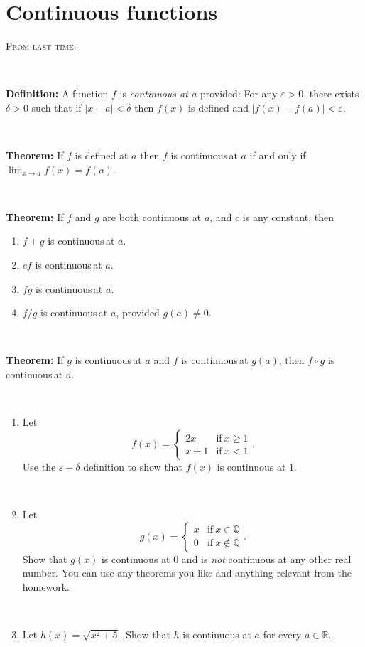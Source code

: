 \documentclass[12pt]{amsart}
\newcommand{\Q}{\mathbb{Q}}
\newcommand{\R}{\mathbb{R}}
\newcommand{\e}{\varepsilon}
\def\d{\delta}
\newcommand{\cts}{continuous\,}
\newcommand{\ds}{\displaystyle}
\begin{document}
	
	\thispagestyle{empty}
	
	\section*{Continuous functions}
	
	\begin{framed}
\noindent \textsc{From last time:}

\

\noindent \textbf{Definition:}  A function $f$ is \emph{continuous at $a$} provided: For any $\e>0$, there exists $\d>0$ such that if $|x-a|<\d$ then $f(x)$ is defined and $|f(x)-f(a)|<\e$.

\

\noindent \textbf{Theorem:} If $f$ is defined at $a$ then $f$ is \cts at $a$ if and only if $\ds\lim_{x\to a} f(x) = f(a)$.

\

\noindent \textbf{Theorem:} If $f$ and $g$ are both continuous at $a$, and $c$ is any constant, then
\begin{enumerate}
\item $f+g$ is \cts at $a$.
\item $cf$ is \cts at $a$.
\item $fg$ is \cts at $a$.
\item $f/g$ is \cts at $a$, provided $g(a)\neq 0$.
\end{enumerate}

\

\noindent \textbf{Theorem:} If $g$ is \cts at $a$ and $f$ is \cts at $g(a)$, then $f\circ g$ is \cts at $a$.


\end{framed}

\

\begin{enumerate}
\item Let \[f(x) = \begin{cases} 2x &\text{if} \ x\geq 1 \\ x+1 &\text{if} \ x<1 \end{cases}.\]
 Use the $\e-\delta$ definition to show that $f(x)$ is continuous at $1$.
 
 \
 
\item Let \[g(x) = \begin{cases} x &\text{if} \ x\in \Q \\ 0 &\text{if} \ x\notin \Q \end{cases}.\]
 Show that $g(x)$ is continuous at $0$ and is \emph{not} continuous at any other real number. You can use any theorems you like and anything relevant from the homework.

\

\item Let $h(x) = \sqrt{ x^2 +5}$. Show that $h$ is continuous at $a$ for every $a\in \R$.
 \end{enumerate}
 
\end{document}
